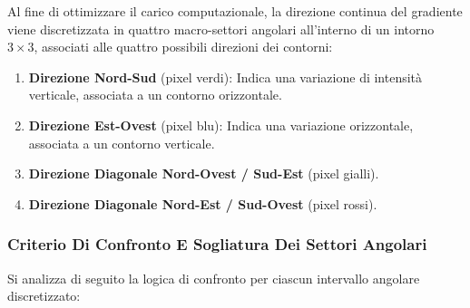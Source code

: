 ﻿\documentclass[11pt, a4paper]{article}
\begin{document}
Al fine di ottimizzare il carico computazionale, la direzione continua del gradiente viene discretizzata in quattro macro-settori angolari all'interno di un intorno $3 \times 3$, associati alle quattro possibili direzioni dei contorni:
\begin{enumerate}
    \item \textbf{Direzione Nord-Sud} (pixel verdi): Indica una variazione di intensità verticale, associata a un contorno orizzontale.
    \item \textbf{Direzione Est-Ovest} (pixel blu): Indica una variazione orizzontale, associata a un contorno verticale.
    \item \textbf{Direzione Diagonale Nord-Ovest / Sud-Est} (pixel gialli).
    \item \textbf{Direzione Diagonale Nord-Est / Sud-Ovest} (pixel rossi).
\end{enumerate}


\subsubsection{Criterio Di Confronto E Sogliatura Dei Settori Angolari}

Si analizza di seguito la logica di confronto per ciascun intervallo angolare discretizzato:
\end{document}
